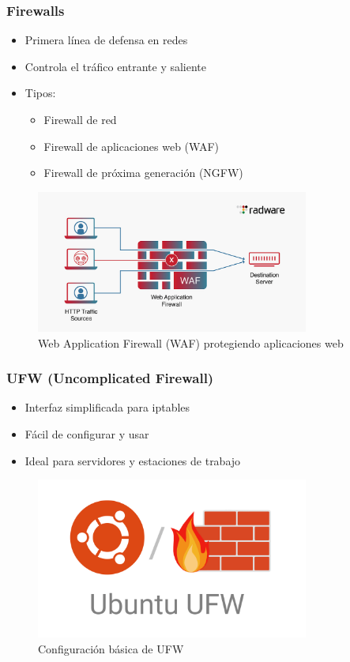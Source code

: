 \documentclass[12pt,a4paper]{article}
\begin{document}
\subsubsection{Firewalls}
\begin{itemize}
    \item Primera línea de defensa en redes
    \item Controla el tráfico entrante y saliente
    \item Tipos:
    \begin{itemize}
        \item Firewall de red
        \item Firewall de aplicaciones web (WAF)
        \item Firewall de próxima generación (NGFW)
    \end{itemize}
\end{itemize}

\begin{figure}[H]
    \centering
    \includegraphics[width=0.8\textwidth]{waf.png}
    \caption{Web Application Firewall (WAF) protegiendo aplicaciones web}
    \label{fig:waf}
\end{figure}

\subsubsection{UFW (Uncomplicated Firewall)}
\begin{itemize}
    \item Interfaz simplificada para iptables
    \item Fácil de configurar y usar
    \item Ideal para servidores y estaciones de trabajo
\end{itemize}

\begin{figure}[H]
    \centering
    \includegraphics[width=0.8\textwidth]{ufw.png}
    \caption{Configuración básica de UFW}
    \label{fig:ufw}
\end{figure}
\end{document}
